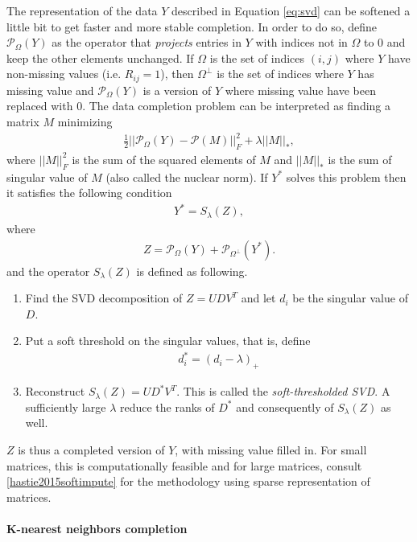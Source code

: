 The representation of the data $Y$ described in Equation \eqref{eq:svd}
can be softened a little bit to get faster and more stable completion. In order
to do so, define $\mathcal{P}_\Omega(Y)$ as the operator that \emph{projects}
entries in $Y$ with indices not in $\Omega$ to $0$ and keep the other elements
unchanged. If $\Omega$ is the set of indices $(i, j)$ where $Y$ have
non-missing values (i.e. $R_{ij}=1$), then $\Omega^{\perp}$ is the set of
indices where $Y$ has missing value and $\mathcal{P}_{\Omega}(Y)$ is a version of
$Y$ where missing value have been replaced with $0$. The data completion
problem can be interpreted as finding a matrix $M$ minimizing
\begin{align*}
\frac{1}{2} \vert\vert \mathcal{P}_\Omega(Y) - \mathcal{P}(M) \vert\vert_F^2 + \lambda \vert \vert M \vert \vert_*,
\end{align*}
where $\vert\vert M \vert \vert^2_F$ is the sum of the squared elements of $M$
and $\vert \vert M \vert \vert_*$ is the sum of singular value of $M$ (also
called the nuclear norm). If $Y^*$ solves this problem then it satisfies the
following condition
\begin{align*}
  Y^* = S_{\lambda}(Z),
\end{align*}
where
\begin{align*}
Z = \mathcal{P}_{\Omega}(Y) + \mathcal{P}_{\Omega^{\perp}}(Y^*).
\end{align*}
and the operator $S_\lambda(Z)$ is defined as following.

\begin{enumerate}
\item Find the SVD decomposition of $Z = UDV^T$ and let $d_i$ be the singular
  value of $D$.
\item Put a soft threshold on the singular values, that is, define
  \begin{align*}
    d_i^* = (d_i - \lambda)_+
  \end{align*}
\item Reconstruct $S_\lambda(Z) = UD^*V^T$. This is called the
  \emph{soft-thresholded SVD}. A sufficiently large $\lambda$ reduce the ranks
  of $D^*$ and consequently of $S_\lambda(Z)$ as well.
\end{enumerate}
$Z$ is thus a completed version of $Y$, with missing value filled in. For small
matrices, this is computationally feasible and for large matrices, consult
\ref{hastie2015softimpute} for the methodology using sparse representation of matrices.

\paragraph{K-nearest neighbors completion}

